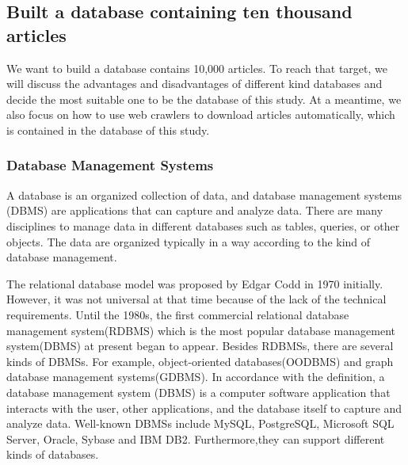 
\subsection{Built a database containing ten thousand articles}

We want to build a database contains 10,000 articles.
To reach that target, we will discuss the advantages and disadvantages of different kind databases and decide the most suitable one to be the database of this study.
At a meantime, we also focus on how to use web crawlers to download articles automatically, which is contained in the database of this study.

\subsubsection{Database Management Systems}

A database is an organized collection of data, and database management systems (DBMS) are applications that can capture and analyze data.
There are many disciplines to manage data in different databases such as tables, queries, or other objects. 
The data are organized typically in a way according to the kind of database management. 

The relational database model was proposed by Edgar Codd in 1970 initially.
However, it was not universal at that time because of the lack of the technical requirements.
Until the 1980s, the first commercial relational database management system(RDBMS) which is the most popular database management system(DBMS) at present began to appear.
Besides RDBMSs, there are several kinds of DBMSs.
For example, object-oriented databases(OODBMS) and graph database management systems(GDBMS).
In accordance with the definition, a database management system (DBMS) is a computer software application that interacts with the user, other applications, and the database itself to capture and analyze data.
Well-known DBMSs include MySQL, PostgreSQL, Microsoft SQL Server, Oracle, Sybase and IBM DB2.
Furthermore,they can support different kinds of databases.




